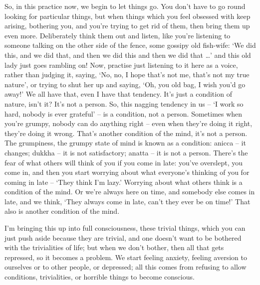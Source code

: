 So, in this practice now, we begin to let things go. You don't have to go round looking for particular things, but when things which you feel obsessed with keep arising, bothering you, and you're trying to get rid of them, then bring them up even more. Deliberately think them out and listen, like you're listening to someone talking on the other side of the fence, some gossipy old fish-wife: `We did this, and we did that, and then we did this and then we did that \ldots{}' and this old lady just goes rambling on! Now, practise just listening to it here as a voice, rather than judging it, saying, `No, no, I hope that's not me, that's not my true nature', or trying to shut her up and saying, `Oh, you old bag, I wish you'd go away!' We all have that, even I have that tendency. It's just a condition of nature, isn't it? It's not a person. So, this nagging tendency in us -- `I work so hard, nobody is ever grateful' -- is a condition, not a person. Sometimes when you're grumpy, nobody can do anything right -- even when they're doing it right, they're doing it wrong. That's another condition of the mind, it's not a person. The grumpiness, the grumpy state of mind is known as a condition: anicca -- it changes; dukkha -- it is not satisfactory; anatta -- it is not a person. There's the fear of what others will think of you if you come in late: you've overslept, you come in, and then you start worrying about what everyone's thinking of you for coming in late -- `They think I'm lazy.' Worrying about what others think is a condition of the mind. Or we're always here on time, and somebody else comes in late, and we think, `They always come in late, can't they ever be on time!' That also is another condition of the mind.

I'm bringing this up into full consciousness, these trivial things, which you can just push aside because they are trivial, and one doesn't want to be bothered with the trivialities of life; but when we don't bother, then all that gets repressed, so it becomes a problem. We start feeling anxiety, feeling aversion to ourselves or to other people, or depressed; all this comes from refusing to allow conditions, trivialities, or horrible things to become conscious.

